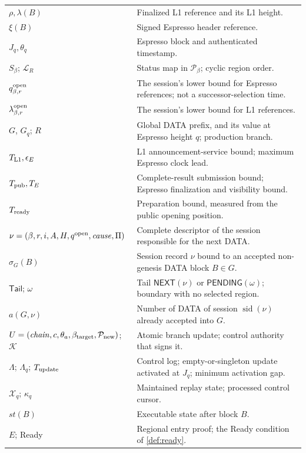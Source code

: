 \documentclass[11pt,a4paper]{article}
\newcommand{\tagg}[1]{\ensuremath{\mathsf{#1}}}
\begin{document}
\begin{table}[htbp]
\begin{tabularx}{\linewidth}{@{}p{.32\linewidth}Y@{}}
$\rho,\lambda(B)$ & Finalized L1 reference and its L1 height.\\
$\xi(B)$ & Signed Espresso header reference.\\
$J_q,\theta_q$ & Espresso block and authenticated timestamp.\\
$S_\beta$; $\mathcal L_R$ & Status map in $\mathcal P_\beta$; cyclic region order.\\
$q_{\beta,r}^{\rm open}$ & The session's lower bound for Espresso references; not a successor-selection time.\\
$\lambda_{\beta,r}^{\rm open}$ & The session's lower bound for L1 references.\\
$G$, $G_q$; $R$ & Global DATA prefix, and its value at Espresso height $q$; production branch.\\
$T_{\rm L1},\epsilon_E$ & L1 announcement-service bound; maximum Espresso clock lead.\\
$T_{\rm pub},T_E$ & Complete-result submission bound; Espresso finalization and visibility bound.\\
$T_{\rm ready}$ & Preparation bound, measured from the public opening position.\\
$\nu=(\beta,r,i,A,H,q^{\rm open},\mathit{cause},\Pi)$ & Complete descriptor of the session responsible for the next DATA.\\
$\sigma_G(B)$ & Session record $\nu$ bound to an accepted non-genesis DATA block $B\in G$.\\
$\mathsf{Tail}$; $\omega$ & Tail $\tagg{NEXT}(\nu)$ or $\tagg{PENDING}(\omega)$; boundary with no selected region.\\
$a(G,\nu)$ & Number of DATA of session $\operatorname{sid}(\nu)$ already accepted into $G$.\\
$U=(\mathit{chain},c,\theta_a,\beta_{\rm target},\mathcal P_{\rm new})$; $\mathcal K$ & Atomic branch update; control authority that signs it.\\
$\Lambda$; $\Lambda_q$; $T_{\rm update}$ & Control log; empty-or-singleton update activated at $J_q$; minimum activation gap.\\
$\mathcal X_q$; $\kappa_q$ & Maintained replay state; processed control cursor.\\
$\mathit{st}(B)$ & Executable state after block $B$.\\
$E$; Ready & Regional entry proof; the Ready condition of \cref{def:ready}.\\
\bottomrule\end{tabularx}
\end{table}
\end{document}
